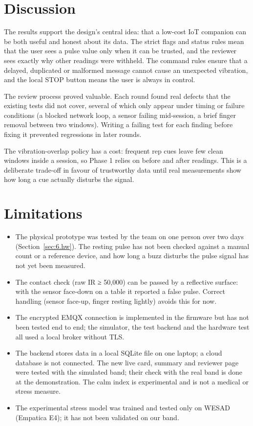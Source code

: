 \documentclass[12pt,letterpaper,oneside]{report}
\begin{document}
\section{Discussion}\label{sec:6.4}

The results support the design's central idea: that a low-cost IoT companion can be both useful and honest about its data. The strict flags and status rules mean that the user sees a pulse value only when it can be trusted, and the reviewer sees exactly why other readings were withheld. The command rules ensure that a delayed, duplicated or malformed message cannot cause an unexpected vibration, and the local STOP button means the user is always in control.


The review process proved valuable. Each round found real defects that the existing tests did not cover, several of which only appear under timing or failure conditions (a blocked network loop, a sensor failing mid-session, a brief finger removal between two windows). Writing a failing test for each finding before fixing it prevented regressions in later rounds.


The vibration-overlap policy has a cost: frequent rep cues leave few clean windows inside a session, so Phase 1 relies on before and after readings. This is a deliberate trade-off in favour of trustworthy data until real measurements show how long a cue actually disturbs the signal.


\section{Limitations}\label{sec:6.5}

\begin{itemize}\item The physical prototype was tested by the team on one person over two days (Section~\ref{sec:6.hw}). The resting pulse has not been checked against a manual count or a reference device, and how long a buzz disturbs the pulse signal has not yet been measured.
\item The contact check (raw IR ≥ 50,000) can be passed by a reflective surface: with the sensor face-down on a table it reported a false pulse. Correct handling (sensor face-up, finger resting lightly) avoids this for now.
\item The encrypted EMQX connection is implemented in the firmware but has not been tested end to end; the simulator, the test backend and the hardware test all used a local broker without TLS.
\item The backend stores data in a local SQLite file on one laptop; a cloud database is not connected. The new live card, summary and reviewer page were tested with the simulated band; their check with the real band is done at the demonstration. The calm index is experimental and is not a medical or stress measure.
\item The experimental stress model was trained and tested only on WESAD (Empatica E4); it has not been validated on our band.
\end{itemize}
\end{document}
